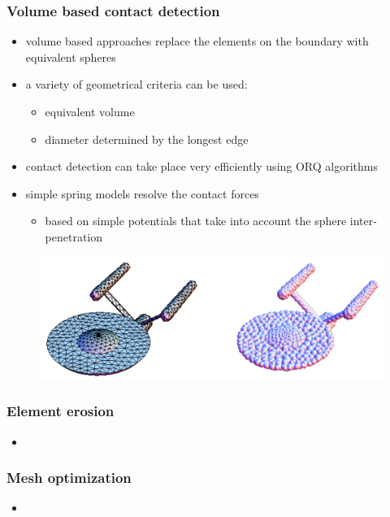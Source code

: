 \begin{frame}[fragile]
%
  \frametitle{Volume based contact detection}
%
  \begin{itemize}
%
  \item volume based approaches replace the elements on the boundary with equivalent spheres
  \item a variety of geometrical criteria can be used: 
    \begin{itemize}
      \item equivalent volume
      \item diameter determined by the longest edge
    \end{itemize}
% 
  \item contact detection can take place very efficiently using ORQ algorithms
  \item simple spring models resolve the contact forces
    \begin{itemize}
    \item based on simple potentials that take into account the sphere inter-penetration
    \end{itemize}
%
  \end{itemize}
%
  \begin{figure}
    \includegraphics[scale=0.5]{figures/mesh-volumecontact.pdf}
  \end{figure}
%
\end{frame}

\begin{frame}[fragile]
%
  \frametitle{Element erosion}
%
  \begin{itemize}
%
  \item 
%
  \end{itemize}
%
\end{frame}

\begin{frame}[fragile]
%
  \frametitle{Mesh optimization}
%
  \begin{itemize}
%
  \item 
%
  \end{itemize}
%
\end{frame}

